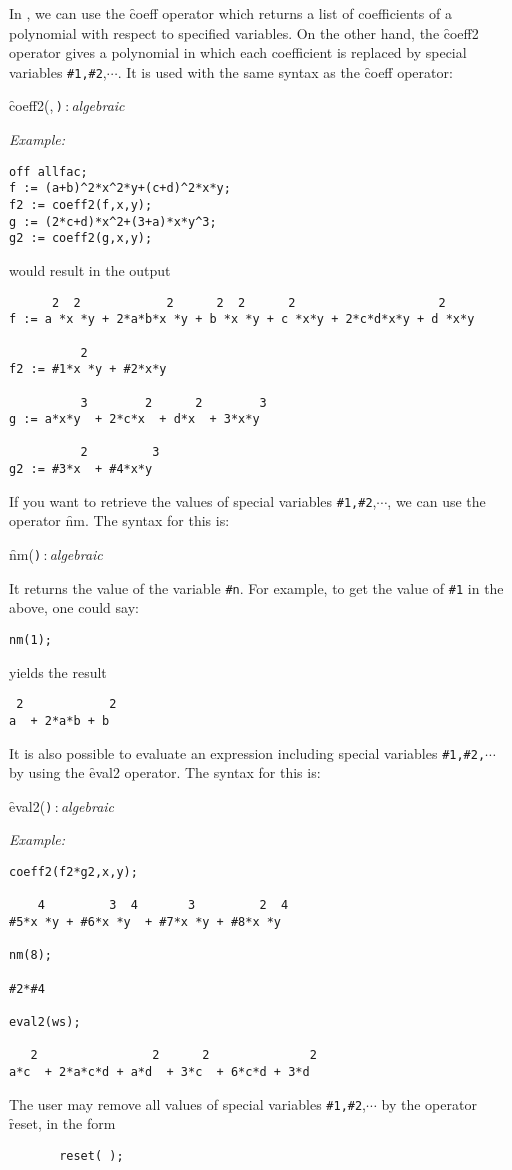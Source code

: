 In \REDUCE,  we can use the \f{coeff} operator which returns a list of coefficients of a polynomial
with respect to  specified variables. 
On the other hand, the \hypertarget{operator:COEFF2}{}\f{coeff2} operator gives a polynomial in which each coefficient is replaced by
special variables \verb|#1,#2|,$\cdots$. It is used with the same syntax as the \f{coeff} operator:
\begin{syntax}
  \f{coeff2(},\,\texttt{)}\,:\,\textit{algebraic}
\end{syntax}
\textit{Example:}
\begin{verbatim}
off allfac;
f := (a+b)^2*x^2*y+(c+d)^2*x*y;
f2 := coeff2(f,x,y);
g := (2*c+d)*x^2+(3+a)*x*y^3;
g2 := coeff2(g,x,y);
\end{verbatim}
would result in the output
\begin{verbatim}
      2  2            2      2  2      2                    2
f := a *x *y + 2*a*b*x *y + b *x *y + c *x*y + 2*c*d*x*y + d *x*y

          2
f2 := #1*x *y + #2*x*y

          3        2      2        3
g := a*x*y  + 2*c*x  + d*x  + 3*x*y

          2         3
g2 := #3*x  + #4*x*y
\end{verbatim}
If you want to retrieve the values of  special variables \verb|#1,#2|,$\cdots$,
we can use the operator \hypertarget{operator:NM}{}\f{nm}. The syntax for this is:
\begin{syntax}
  \f{nm(}\texttt{)}\,:\,\textit{algebraic}
\end{syntax}
It returns the value of the variable \verb|#n|. For example, to get the value of 
\verb|#1| in the above, one could say:
\begin{verbatim}
nm(1);
\end{verbatim}
yields the result
\begin{verbatim}
 2            2
a  + 2*a*b + b
\end{verbatim}
It is also possible to evaluate an expression including  special variables \verb|#1,#2,|$\cdots$
by using the \hypertarget{operator:EVAL2}{}\f{eval2} operator.
The syntax for this is:
\begin{syntax}
  \f{eval2(}\texttt{)}\,:\,\textit{algebraic}
\end{syntax}
\textit{Example:}
\begin{verbatim}
coeff2(f2*g2,x,y);

    4         3  4       3         2  4
#5*x *y + #6*x *y  + #7*x *y + #8*x *y

nm(8);

#2*#4

eval2(ws);

   2                2      2              2
a*c  + 2*a*c*d + a*d  + 3*c  + 6*c*d + 3*d

\end{verbatim}
The user may remove all values of special variables \verb|#1,#2|,$\cdots$
by the operator \hypertarget{operator:RESET}{}\f{reset}, in the form
\begin{verbatim}
       reset( );
\end{verbatim}

